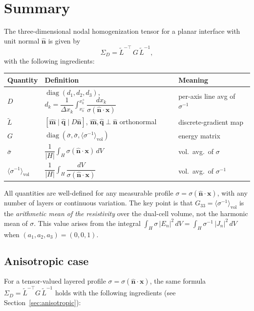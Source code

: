\documentclass[11pt]{article}
\newcommand{\nn}{\hat{\bm{n}}}
\newcommand{\mm}{\hat{\bm{m}}}
\newcommand{\qq}{\hat{\bm{q}}}
\newcommand{\tL}{\widetilde{L}}
\newcommand{\SD}{\Sigma_D}
\newcommand{\sbar}{\bar{\sigma}}
\newcommand{\invs}{\langle\sigma^{-1}\rangle_{\mathrm{vol}}}
\begin{document}
\section{Summary}

The three-dimensional nodal homogenization tensor for a planar interface with
unit normal $\nn$ is given by
\[
    \SD = \tL^{-\top}\,G\,\tL^{-1},
\]
with the following ingredients:

\medskip
\begin{center}
\renewcommand{\arraystretch}{1.6}
\begin{tabular}{lll}
\toprule
Quantity & Definition & Meaning \\
\midrule
$D$ & $\operatorname{diag}(d_1,d_2,d_3)$,\quad
      $d_k = \dfrac{1}{\Delta x_k}\displaystyle\int_{x_k^-}^{x_k^+}
      \dfrac{dx_k}{\sigma(\nn\cdot\bm{x})}$
    & per-axis line avg of $\sigma^{-1}$ \\[4pt]
$\tL$ & $[\mm\mid\qq\mid D\nn]$, \quad $\mm,\qq\perp\nn$ orthonormal & discrete-gradient map \\
$G$ & $\operatorname{diag}(\sbar,\sbar,\invs)$ & energy matrix \\
$\sbar$ & $\dfrac{1}{|H|}\displaystyle\int_H \sigma(\nn\cdot\bm{x})\,dV$ & vol.\ avg.\ of $\sigma$ \\[4pt]
$\invs$ & $\dfrac{1}{|H|}\displaystyle\int_H \dfrac{dV}{\sigma(\nn\cdot\bm{x})}$ & vol.\ avg.\ of $\sigma^{-1}$ \\
\bottomrule
\end{tabular}
\end{center}

\medskip\noindent
All quantities are well-defined for any measurable profile
$\sigma = \sigma(\nn\cdot\bm{x})$, with any number of layers or continuous
variation.  The key point is that $G_{33} = \invs$ is the
\emph{arithmetic mean of the resistivity} over the dual-cell volume, not
the harmonic mean of $\sigma$.  This value arises from the integral
$\int_H \sigma\,|E_n|^2\,dV = \int_H \sigma^{-1}\,|J_n|^2\,dV$
when $(a_1,a_2,a_3)=(0,0,1)$.

\subsection*{Anisotropic case}

For a tensor-valued layered profile $\sigma = \sigma(\nn\cdot\bm{x})$, the
same formula $\SD = \tL^{-\top}G\,\tL^{-1}$ holds with the following
ingredients (see Section~\ref{sec:anisotropic}):
\end{document}
